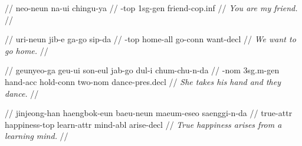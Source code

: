 \documentclass{article}
\begin{document}
\ex
\begingl
\gla {}   //
\glb neo-neun na-ui chingu-ya //
-{\sc top} {\sc 1sg}-{\sc gen} friend-{\sc cop.inf} //
\glft \textit{You are my friend.} //
\endgl
\xe

\ex
\begingl
\gla {}    //
\glb uri-neun jib-e ga-go sip-da //
-{\sc top} home-{\sc all} go-{\sc conn} want-{\sc decl} //
\glft \textit{We want to go home.} //
\endgl
\xe

\ex
\begingl
\gla {}      //
\glb geunyeo-ga geu-ui son-eul jab-go dul-i chum-chu-n-da //
-{\sc nom} {\sc 3sg.m}-{\sc gen} hand-{\sc acc} hold-{\sc conn} two-{\sc nom} dance-{\sc pres.decl} //
\glft \textit{She takes his hand and they dance.} //
\endgl
\xe

\ex
\begingl
\gla {}     //
\glb jinjeong-han haengbok-eun baeu-neun maeum-eseo saenggi-n-da //
\glc true-{\sc attr} happiness-{\sc top} learn-{\sc attr} mind-{\sc abl} arise-{\sc decl} //
\glft \textit{True happiness arises from a learning mind.} //
\endgl
\xe
\end{document}
